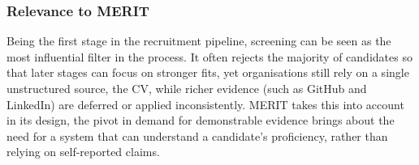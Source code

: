 \subsubsection{Relevance to MERIT}
Being the first stage in the recruitment pipeline, screening can be seen as the most influential filter in the process.
It often rejects the majority of candidates so that later stages can focus on stronger fits, yet organisations 
still rely on a single unstructured source, the CV, while richer evidence (such as GitHub and LinkedIn) are 
deferred or applied inconsistently. MERIT takes this into account in its design, the pivot in demand for demonstrable evidence 
brings about the need for a system that can understand a candidate's proficiency, rather than relying on self-reported claims.

